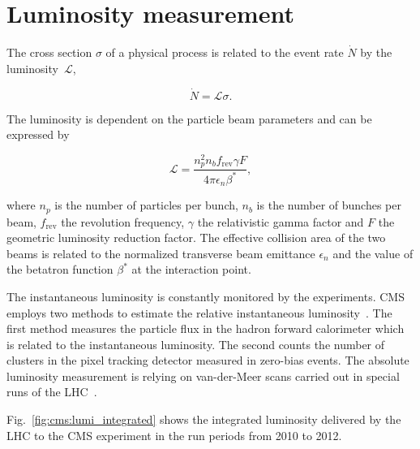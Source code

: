 \section{Luminosity measurement}
\label{sec:lumi_measurement}

The cross section $\sigma$ of a physical process is related to the
event rate $\dot{N}$ by the luminosity~$\mathcal{L}$,

\begin{equation*}
    \dot{N} = \mathcal{L} \sigma.
\end{equation*}

The luminosity is dependent on the particle beam parameters and can be expressed
by

\begin{equation*}
    \mathcal{L} = \frac{n_p^2
        n_b f_\mathrm{rev} \gamma F}{4 \pi \epsilon_n \beta^*},
\end{equation*}

where $n_p$ is the number of particles per bunch, $n_b$ is the number of bunches
per beam, $f_\mathrm{rev}$ the revolution frequency, $\gamma$ the relativistic
gamma factor and $F$ the geometric luminosity reduction factor. The effective
collision area of the two beams is related to the normalized transverse beam
emittance $\epsilon_n$ and the value of the betatron function $\beta^*$ at the
interaction point.

The instantaneous luminosity is constantly monitored by the experiments. CMS
employs two methods to estimate the relative instantaneous
luminosity~\cite{CMS-PAS-LUM-13-001}. The first method measures the particle
flux in the hadron forward calorimeter which is related to the instantaneous
luminosity. The second counts the number of clusters in the pixel tracking
detector measured in zero-bias events. The absolute luminosity measurement is
relying on van-der-Meer scans carried out in special runs of the
LHC~\cite{vanderMeer:296752}.

Fig.~\ref{fig:cms:lumi_integrated} shows the integrated luminosity delivered by
the LHC to the CMS experiment in the run periods from 2010 to 2012.

